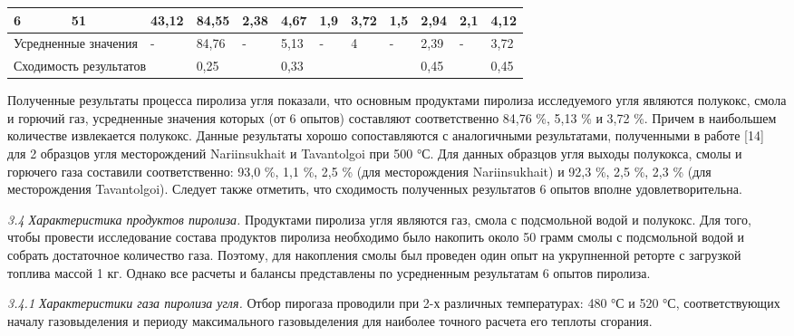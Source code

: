 \begin{table}[H]
{\begin{tabular}{|llllllllllll|}
\multicolumn{1}{|l|}{6} & \multicolumn{1}{l|}{51} & \multicolumn{1}{l|}{43,12} & \multicolumn{1}{l|}{84,55} & \multicolumn{1}{l|}{2,38} & \multicolumn{1}{l|}{4,67} & \multicolumn{1}{l|}{1,9} & \multicolumn{1}{l|}{3,72} & \multicolumn{1}{l|}{1,5} & \multicolumn{1}{l|}{2,94} & \multicolumn{1}{l|}{2,1} & 4,12 \\ \hline
\multicolumn{2}{|l|}{Усредненные значения} & \multicolumn{1}{l|}{-} & \multicolumn{1}{l|}{84,76} & \multicolumn{1}{l|}{-} & \multicolumn{1}{l|}{5,13} & \multicolumn{1}{l|}{-} & \multicolumn{1}{l|}{4} & \multicolumn{1}{l|}{-} & \multicolumn{1}{l|}{2,39} & \multicolumn{1}{l|}{-} & 3,72 \\ \hline
\multicolumn{3}{|l|}{Сходимость результатов} & \multicolumn{1}{l|}{0,25} & \multicolumn{1}{l|}{} & \multicolumn{1}{l|}{0,33} & \multicolumn{1}{l|}{} & \multicolumn{1}{l|}{} & \multicolumn{1}{l|}{} & \multicolumn{1}{l|}{0,45} & \multicolumn{1}{l|}{} & 0,45 \\ \hline
\end{tabular}
}
\end{table}

Полученные результаты процесса пиролиза угля показали, что основным
продуктами пиролиза исследуемого угля являются полукокс, смола и горючий
газ, усредненные значения которых (от 6 опытов) составляют
соответственно 84,76 \%, 5,13 \% и 3,72 \%. Причем в наибольшем
количестве извлекается полукокс. Данные результаты хорошо сопоставляются
с аналогичными результатами, полученными в работе {[}14{]} для 2
образцов угля месторождений Nariinsukhait и Tavantolgoi при 500 °С. Для
данных образцов угля выходы полукокса, смолы и горючего газа составили
соответственно: 93,0 \%, 1,1 \%, 2,5 \% (для месторождения
Nariinsukhait) и 92,3 \%, 2,5 \%, 2,3 \% (для месторождения
Tavantolgoi). Следует также отметить, что сходимость полученных
результатов 6 опытов вполне удовлетворительна.

\emph{3.4 Характеристика продуктов пиролиза.} Продуктами пиролиза угля
являются газ, смола с подсмольной водой и полукокс. Для того, чтобы
провести исследование состава продуктов пиролиза необходимо было
накопить около 50 грамм смолы с подсмольной водой и собрать достаточное
количество газа. Поэтому, для накопления смолы был проведен один опыт на
укрупненной реторте с загрузкой топлива массой 1 кг. Однако все расчеты
и балансы представлены по усредненным результатам 6 опытов пиролиза.

\emph{3.4.1 Характеристики газа пиролиза угля.} Отбор пирогаза проводили
при 2-х различных температурах: 480 °С и 520 °С, соответствующих началу
газовыделения и периоду максимального газовыделения для наиболее точного
расчета его теплоты сгорания.

